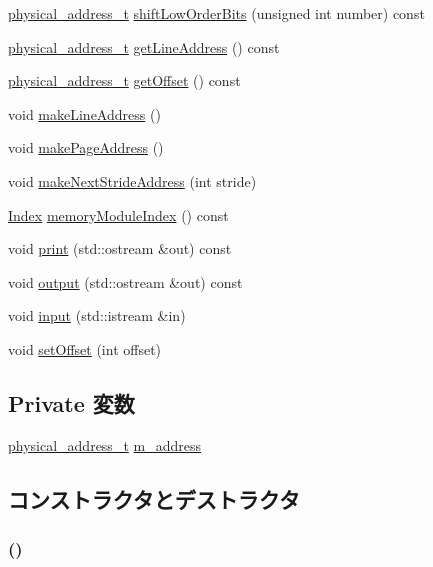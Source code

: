 \begin{DoxyCompactItemize}
\item 
\hyperlink{TypeDefines_8hh_a7901e1a365850c5ff38ec6e12b6b9ffc}{physical\_\-address\_\-t} \hyperlink{classAddress_a146a23f7187a79982f77b143db52835f}{shiftLowOrderBits} (unsigned int number) const 
\item 
\hyperlink{TypeDefines_8hh_a7901e1a365850c5ff38ec6e12b6b9ffc}{physical\_\-address\_\-t} \hyperlink{classAddress_a3d5e121d4366c4cba97dbb38ad2f8b00}{getLineAddress} () const 
\item 
\hyperlink{TypeDefines_8hh_a7901e1a365850c5ff38ec6e12b6b9ffc}{physical\_\-address\_\-t} \hyperlink{classAddress_a7f7b431504ce24277fd98a99a51e7865}{getOffset} () const 
\item 
void \hyperlink{classAddress_a16ec7c723f772ab7bee0af7d2e7a4305}{makeLineAddress} ()
\item 
void \hyperlink{classAddress_a9887a46e51d7ee63cc947dcdb0b29da3}{makePageAddress} ()
\item 
void \hyperlink{classAddress_a2cff729156aa38b416f0d32cea14977b}{makeNextStrideAddress} (int stride)
\item 
\hyperlink{TypeDefines_8hh_a39642de41f3574937f399f4fab25ba18}{Index} \hyperlink{classAddress_a90f2c61fd9821553b17cdf29d5a3c662}{memoryModuleIndex} () const 
\item 
void \hyperlink{classAddress_ac55fe386a101fbae38c716067c9966a0}{print} (std::ostream \&out) const 
\item 
void \hyperlink{classAddress_ad219174fdc50e934776bd97403903d00}{output} (std::ostream \&out) const 
\item 
void \hyperlink{classAddress_a62ef2ea8dd5db08546872dab6ed957ff}{input} (std::istream \&in)
\item 
void \hyperlink{classAddress_a360f28b444fb8f8ee6db216f80a54248}{setOffset} (int offset)
\end{DoxyCompactItemize}
\subsection*{Private 変数}
\begin{DoxyCompactItemize}
\item 
\hyperlink{TypeDefines_8hh_a7901e1a365850c5ff38ec6e12b6b9ffc}{physical\_\-address\_\-t} \hyperlink{classAddress_a854e037cfd8d3493a1770258559bf1b0}{m\_\-address}
\end{DoxyCompactItemize}


\subsection{コンストラクタとデストラクタ}
\hypertarget{classAddress_ac98de6c9250be1b4e3446d9989e058b3}{
\subsubsection[{Address}]{ ()}}
\label{classAddress_ac98de6c9250be1b4e3446d9989e058b3}



